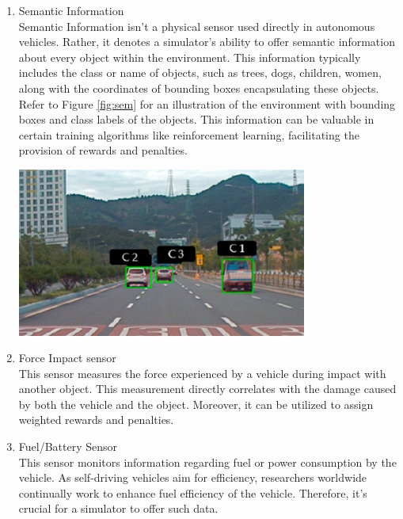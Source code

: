 \documentclass[12pt,twoside,a4paper,parskip]{scrbook} %
\begin{document}
\begin{enumerate}[label=\alph*.]
    \item Semantic Information \\
    Semantic Information isn't a physical sensor used directly in autonomous vehicles. Rather, it denotes a simulator's ability to offer semantic information about every object within the environment. This information typically includes the class or name of objects, such as trees, dogs, children, women, along with the coordinates of bounding boxes encapsulating these objects. Refer to Figure \ref{fig:sem} \cite{senimage} for an illustration of the environment with bounding boxes and class labels of the objects. This information can be valuable in certain training algorithms like reinforcement learning, facilitating the provision of rewards and penalties.
    \begin{minipage}[t]{\linewidth}
        \centering
        \includegraphics[width=0.75\textwidth]{Images/semantic.png}
        \label{fig:sem}
        \vspace{-\baselineskip} %
    \end{minipage}
    \hfill
    \item Force Impact sensor \\
    This sensor measures the force experienced by a vehicle during impact with another object. This measurement directly correlates with the damage caused by both the vehicle and the object. Moreover, it can be utilized to assign weighted rewards and penalties.

    \item Fuel/Battery Sensor \\
    This sensor monitors information regarding fuel or power consumption by the vehicle. As self-driving vehicles aim for efficiency, researchers worldwide continually work to enhance fuel efficiency of the vehicle. Therefore, it's crucial for a simulator to offer such data.


\end{enumerate}
\end{document}
